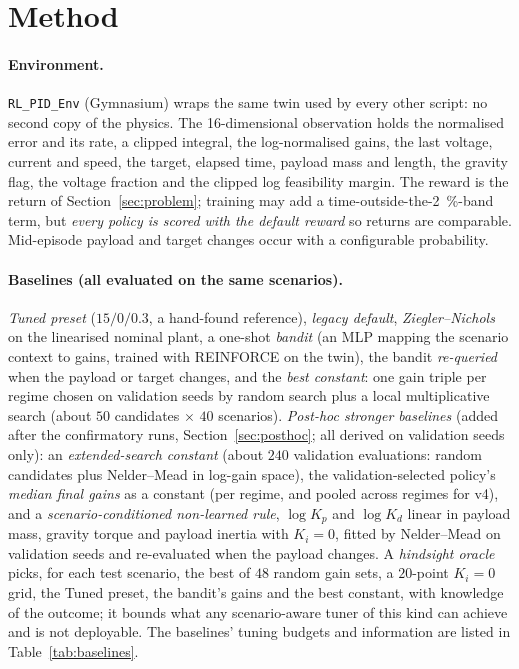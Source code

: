 \section{Method}\label{sec:method}
\paragraph*{Environment.} \texttt{RL\_PID\_Env} (Gymnasium) wraps the same twin used by every other script: no second copy of the physics. The 16-dimensional observation holds the normalised error and its rate, a clipped integral, the log-normalised gains, the last voltage, current and speed, the target, elapsed time, payload mass and length, the gravity flag, the voltage fraction and the clipped log feasibility margin. The reward is the return of Section~\ref{sec:problem}; training may add a time-outside-the-\SI{2}{\%}-band term, but \emph{every policy is scored with the default reward} so returns are comparable. Mid-episode payload and target changes occur with a configurable probability.

\paragraph*{Baselines (all evaluated on the same scenarios).} \emph{Tuned preset} ($15/0/0.3$, a hand-found reference), \emph{legacy default}, \emph{Ziegler--Nichols} on the linearised nominal plant, a one-shot \emph{bandit} (an MLP mapping the scenario context to gains, trained with REINFORCE on the twin), the bandit \emph{re-queried} when the payload or target changes, and the \emph{best constant}: one gain triple per regime chosen on validation seeds by random search plus a local multiplicative search (about $50$ candidates $\times$ $40$ scenarios). \emph{Post-hoc stronger baselines} (added after the confirmatory runs, Section~\ref{sec:posthoc}; all derived on validation seeds only): an \emph{extended-search constant} (about $240$ validation evaluations: random candidates plus Nelder--Mead in log-gain space), the validation-selected policy's \emph{median final gains} as a constant (per regime, and pooled across regimes for v4), and a \emph{scenario-conditioned non-learned rule}, $\log K_p$ and $\log K_d$ linear in payload mass, gravity torque and payload inertia with $K_i=0$, fitted by Nelder--Mead on validation seeds and re-evaluated when the payload changes. A \emph{hindsight oracle} picks, for each test scenario, the best of $48$ random gain sets, a $20$-point $K_i=0$ grid, the Tuned preset, the bandit's gains and the best constant, with knowledge of the outcome; it bounds what any scenario-aware tuner of this kind can achieve and is not deployable. The baselines' tuning budgets and information are listed in Table~\ref{tab:baselines}.

